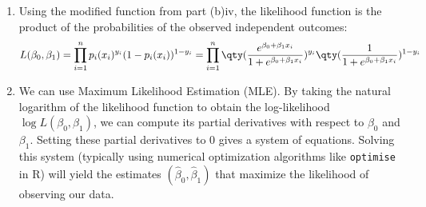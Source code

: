 \documentclass[12pt,english]{article}\usepackage[]{graphicx}\usepackage[]{xcolor}
\begin{document}
\begin{enumerate}[label=\arabic*.]
\begin{enumerate}[label=(\alph*)]
\begin{enumerate}[label=\roman*.]
			\item When $x_i = 0$, $p_i = \frac{e^0}{1+e^0} = \frac{1}{2} = 0.5$. This seems too high for the Titanic data. Since the overall baseline survival rate was much lower (approximately $32.55\%$), a fare of $0$ (representing the poorest passengers or crew members) should correspond to a survival probability significantly lower than the average.
			\item We can modify the function by adding an intercept term $\beta_0$ to the exponent:
			\[
				p_i(x_i) = \frac{e^{\beta_0 + \beta_1 x_i}}{1 + e^{\beta_0 + \beta_1 x_i}}
			\]
		\end{enumerate}
		\item Using the modified function from part (b)iv, the likelihood function is the product of the probabilities of the observed independent outcomes:
		\[
			L(\beta_0, \beta_1) = \prod_{i=1}^n p_i(x_i)^{y_i} (1-p_i(x_i))^{1-y_i} = \prod_{i=1}^n \qty( \frac{e^{\beta_0 + \beta_1 x_i}}{1 + e^{\beta_0 + \beta_1 x_i}} )^{y_i} \qty( \frac{1}{1 + e^{\beta_0 + \beta_1 x_i}} )^{1-y_i}
		\]
		\item We can use Maximum Likelihood Estimation (MLE). By taking the natural logarithm of the likelihood function to obtain the log-likelihood $\log L(\beta_0, \beta_1)$, we can compute its partial derivatives with respect to $\beta_0$ and $\beta_1$. Setting these partial derivatives to $0$ gives a system of equations. Solving this system (typically using numerical optimization algorithms like \texttt{optimise} in R) will yield the estimates $(\hat{\beta}_0, \hat{\beta}_1)$ that maximize the likelihood of observing our data.
\end{enumerate}
\end{enumerate}
\end{document}
